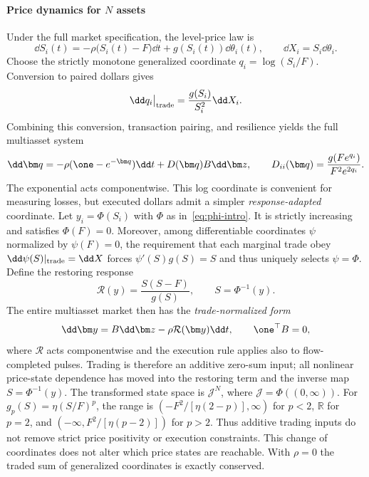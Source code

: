 \documentclass[review,hidelinks,onefignum,onetabnum]{siamonline250211}
\begin{document}
\paragraph{Price dynamics for $N$ assets} Under the full market specification, the level-price law is
\begin{equation}\label{eq:level-dynamics}
\dd S_i(t)=-\rho\big(S_i(t)-F\big)\dd t+g(S_i(t))\dd\theta_i(t),\qquad \dd X_i=S_i\dd\theta_i.
\end{equation}
Choose the strictly monotone generalized coordinate $q_i=\log(S_i/F)$. Conversion to paired dollars gives
\begin{equation}\label{eq:log-impact}
\dd q_i\big|_{\rm trade}=\frac{g(S_i)}{S_i^2}\dd X_i.
\end{equation}
Combining this conversion, transaction pairing, and resilience yields the full multiasset system
\begin{equation}\label{eq:master}
\dd\bm q=-\rho(\one-e^{-\bm q})\dd t+D(\bm q)B\dd\bm z,\qquad
D_{ii}(\bm q)=\frac{g(Fe^{q_i})}{F^2e^{2q_i}}.
\end{equation}
The exponential acts componentwise. This log coordinate is convenient for measuring losses, but executed dollars admit a simpler \emph{response-adapted} coordinate. Let $y_i=\Phi(S_i)$ with $\Phi$ as in~\eqref{eq:phi-intro}. It is strictly increasing and satisfies $\Phi(F)=0$. Moreover, among differentiable coordinates $\psi$ normalized by $\psi(F)=0$, the requirement that each marginal trade obey $\dd\psi(S)|_{\rm trade}=\dd X$ forces $\psi'(S)g(S)=S$ and thus uniquely selects $\psi=\Phi$. Define the restoring response
\[
\mathcal R(y)=\frac{S(S-F)}{g(S)},\qquad S=\Phi^{-1}(y).
\]
The entire multiasset market then has the \emph{trade-normalized form}
\begin{equation}\label{eq:normal-form}
\dd\bm y=B\dd\bm z-\rho\mathcal R(\bm y)\dd t,\qquad\one^\top B=0,
\end{equation}
where $\mathcal R$ acts componentwise and the execution rule applies also to flow-completed pulses. Trading is therefore an additive zero-sum input; all nonlinear price-state dependence has moved into the restoring term and the inverse map $S=\Phi^{-1}(y)$. The transformed state space is $\mathcal J^N$, where $\mathcal J=\Phi((0,\infty))$. For $g_p(S)=\eta(S/F)^p$, the range is $(-F^2/[\eta(2-p)],\infty)$ for $p<2$, $\mathbb R$ for $p=2$, and $(-\infty,F^2/[\eta(p-2)])$ for $p>2$. Thus additive trading inputs do not remove strict price positivity or execution constraints. This change of coordinates does not alter which price states are reachable. With $\rho=0$ the traded sum of generalized coordinates is exactly conserved.
\end{document}
